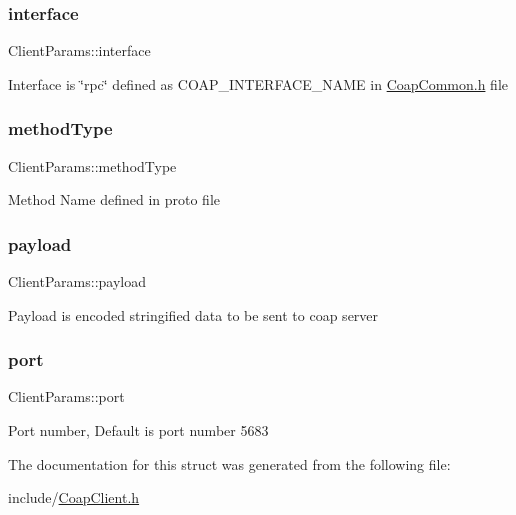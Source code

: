 \subsubsection{\texorpdfstring{interface}{interface}}
{\footnotesize\ttfamily Client\+Params\+::interface}

Interface is \char`\"{}rpc\char`\"{} defined as C\+O\+A\+P\+\_\+\+I\+N\+T\+E\+R\+F\+A\+C\+E\+\_\+\+N\+A\+ME in \hyperlink{CoapCommon_8h}{Coap\+Common.\+h} file \mbox{\label{structClientParams_ac6202bfc3778f0ea08c40e29ca1bc891}} 
\subsubsection{\texorpdfstring{method\+Type}{methodType}}
{\footnotesize\ttfamily Client\+Params\+::method\+Type}

Method Name defined in proto file \mbox{\label{structClientParams_afda4769c8fe511da0db2bc541023ad47}} 
\subsubsection{\texorpdfstring{payload}{payload}}
{\footnotesize\ttfamily Client\+Params\+::payload}

Payload is encoded stringified data to be sent to coap server \mbox{\label{structClientParams_aa71e8951100ec8ea3cfa3e7be5e6ae22}} 
\subsubsection{\texorpdfstring{port}{port}}
{\footnotesize\ttfamily Client\+Params\+::port}

Port number, Default is port number 5683 

The documentation for this struct was generated from the following file\+:\begin{DoxyCompactItemize}
\item 
include/\hyperlink{CoapClient_8h}{Coap\+Client.\+h}\end{DoxyCompactItemize}
